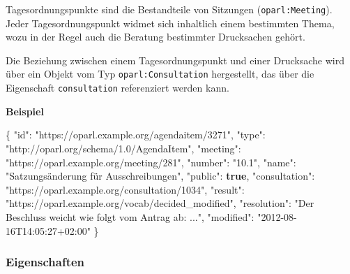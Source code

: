 \documentclass[,a4paper]{article}
\newenvironment{Shaded}{}{}
\newcommand{\KeywordTok}[1]{\textcolor[rgb]{0.00,0.44,0.13}{\textbf{{#1}}}}
\newcommand{\DataTypeTok}[1]{\textcolor[rgb]{0.56,0.13,0.00}{{#1}}}
\newcommand{\StringTok}[1]{\textcolor[rgb]{0.25,0.44,0.63}{{#1}}}
\newcommand{\FunctionTok}[1]{\textcolor[rgb]{0.02,0.16,0.49}{{#1}}}
\begin{document}

Tagesordnungspunkte sind die Bestandteile von Sitzungen
(\texttt{oparl:Meeting}). Jeder Tagesordnungspunkt widmet sich
inhaltlich einem bestimmten Thema, wozu in der Regel auch die Beratung
bestimmter Drucksachen gehört.

Die Beziehung zwischen einem Tagesordnungspunkt und einer Drucksache
wird über ein Objekt vom Typ \texttt{oparl:Consultation} hergestellt,
das über die Eigenschaft \texttt{consultation} referenziert werden kann.

\textbf{Beispiel}

\begin{Shaded}
\begin{Highlighting}[]
\FunctionTok{\{}
    \DataTypeTok{"id"}\FunctionTok{:} \StringTok{"https://oparl.example.org/agendaitem/3271"}\FunctionTok{,}
    \DataTypeTok{"type"}\FunctionTok{:} \StringTok{"http://oparl.org/schema/1.0/AgendaItem"}\FunctionTok{,}
    \DataTypeTok{"meeting"}\FunctionTok{:} \StringTok{"https://oparl.example.org/meeting/281"}\FunctionTok{,}
    \DataTypeTok{"number"}\FunctionTok{:} \StringTok{"10.1"}\FunctionTok{,}
    \DataTypeTok{"name"}\FunctionTok{:} \StringTok{"Satzungsänderung für Ausschreibungen"}\FunctionTok{,}
    \DataTypeTok{"public"}\FunctionTok{:} \KeywordTok{true}\FunctionTok{,}
    \DataTypeTok{"consultation"}\FunctionTok{:} \StringTok{"https://oparl.example.org/consultation/1034"}\FunctionTok{,}
    \DataTypeTok{"result"}\FunctionTok{:} \StringTok{"https://oparl.example.org/vocab/decided_modified"}\FunctionTok{,}
    \DataTypeTok{"resolution"}\FunctionTok{:} \StringTok{"Der Beschluss weicht wie folgt vom Antrag ab: ..."}\FunctionTok{,}
    \DataTypeTok{"modified"}\FunctionTok{:} \StringTok{"2012-08-16T14:05:27+02:00"}
\FunctionTok{\}}
\end{Highlighting}
\end{Shaded}

\subsubsection{Eigenschaften}\label{eigenschaften-5}
\end{document}
